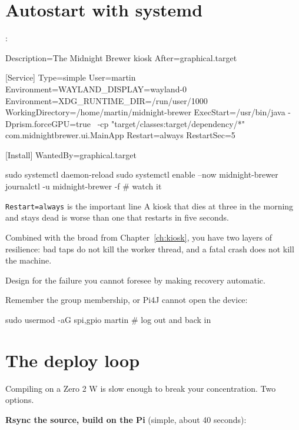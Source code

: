\section{Autostart with systemd}

:

\begin{shell}
[Unit]
Description=The Midnight Brewer kiosk
After=graphical.target

[Service]
Type=simple
User=martin
Environment=WAYLAND_DISPLAY=wayland-0
Environment=XDG_RUNTIME_DIR=/run/user/1000
WorkingDirectory=/home/martin/midnight-brewer
ExecStart=/usr/bin/java -Dprism.forceGPU=true \
    -cp "target/classes:target/dependency/*" com.midnightbrewer.ui.MainApp
Restart=always
RestartSec=5

[Install]
WantedBy=graphical.target
\end{shell}

\begin{shell}
sudo systemctl daemon-reload
sudo systemctl enable --now midnight-brewer
journalctl -u midnight-brewer -f      # watch it
\end{shell}

\begin{concept}{\texttt{Restart=always} is the important line}
A kiosk that dies at three in the morning and stays dead is worse than one that
restarts in five seconds.

Combined with the broad  from
Chapter~\ref{ch:kiosk}, you have two layers of resilience: bad taps do not kill
the worker thread, and a fatal crash does not kill the machine.

Design for the failure you cannot foresee by making recovery automatic.
\end{concept}

Remember the group membership, or Pi4J cannot open the device:

\begin{shell}
sudo usermod -aG spi,gpio martin      # log out and back in
\end{shell}

\section{The deploy loop}

Compiling on a Zero 2 W is slow enough to break your concentration. Two options.

\textbf{Rsync the source, build on the Pi} (simple, about 40 seconds):

